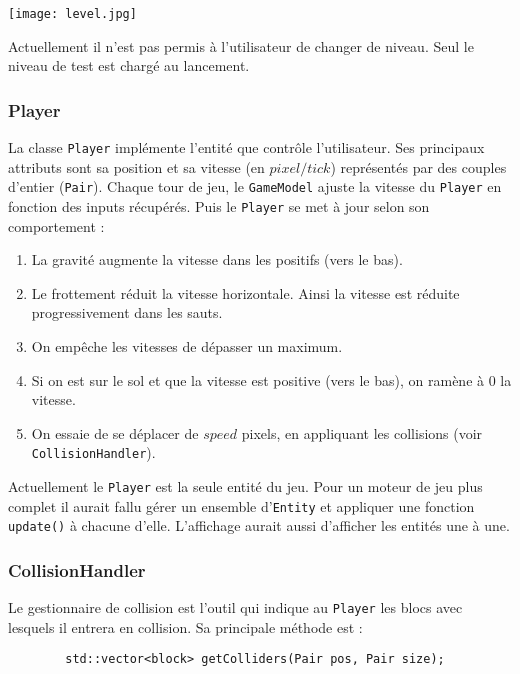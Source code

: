 \documentclass[a4paper,11pt]{article}
\begin{document}
\begin{center}
\texttt{[image: level.jpg]}
\end{center}

\vspace{1cm}
Actuellement il n'est pas permis à l'utilisateur de changer de niveau. Seul le niveau de test est chargé au lancement.


\subsubsection*{Player}
La classe \texttt{Player} implémente l'entité que contrôle l'utilisateur. Ses principaux attributs sont sa position et sa vitesse (en $pixel/tick$) représentés par des couples d'entier (\texttt{Pair}). Chaque tour de jeu, le \texttt{GameModel} ajuste la vitesse du \texttt{Player} en fonction des inputs récupérés. Puis le \texttt{Player} se met à jour selon son comportement :
\begin{enumerate}
\item La gravité augmente la vitesse dans les positifs (vers le bas).
\item Le frottement réduit la vitesse horizontale. Ainsi la vitesse est réduite progressivement dans les sauts.
\item On empêche les vitesses de dépasser un maximum.
\item Si on est sur le sol et que la vitesse est positive (vers le bas), on ramène à 0 la vitesse.
\item On essaie de se déplacer de $speed$ pixels, en appliquant les collisions (voir \texttt{CollisionHandler}).
\end{enumerate}

Actuellement le \texttt{Player} est la seule entité du jeu. Pour un moteur de jeu plus complet il aurait fallu gérer un ensemble d'\texttt{Entity} et appliquer une fonction \texttt{update()} à chacune d'elle. L'affichage aurait aussi d'afficher les entités une à une.

\subsubsection*{CollisionHandler}
Le gestionnaire de collision est l'outil qui indique au \texttt{Player} les blocs avec lesquels il entrera en collision. Sa principale méthode est :
\begin{lstlisting}
        std::vector<block> getColliders(Pair pos, Pair size);
\end{lstlisting}
\end{document}
